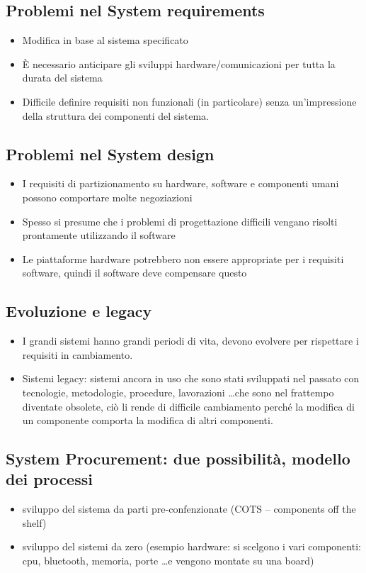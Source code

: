 \subsection{Problemi nel System requirements}
\begin{itemize}
     \item Modifica in base al sistema specificato
     \item È necessario anticipare gli sviluppi hardware/comunicazioni per tutta la durata del sistema
     \item Difficile definire requisiti non funzionali (in particolare) senza un'impressione della struttura dei componenti del sistema.
\end{itemize}
\subsection{Problemi nel System design}
\begin{itemize}
     \item I requisiti di partizionamento su hardware, software e componenti umani possono comportare molte negoziazioni
     \item Spesso si presume che i problemi di progettazione difficili vengano risolti prontamente utilizzando il software
     \item Le piattaforme hardware potrebbero non essere appropriate per i requisiti software, quindi il software deve compensare questo
\end{itemize}
\subsection{Evoluzione e legacy}
\begin{itemize}
    \item I grandi sistemi hanno grandi periodi di vita, devono evolvere per rispettare i requisiti in cambiamento.
    \item Sistemi legacy: sistemi ancora in uso che sono stati sviluppati nel passato con tecnologie, metodologie, procedure, lavorazioni \dots che sono nel frattempo diventate obsolete, ciò li rende di difficile cambiamento perché la modifica di un componente comporta la modifica di altri componenti.
\end{itemize}
\subsection{System Procurement: due possibilità, modello dei processi}
\begin{itemize}
    \item sviluppo del sistema da parti pre-confenzionate (COTS -- components off the shelf)
    \item sviluppo del sistemi da zero (esempio hardware: si scelgono i vari componenti: cpu, bluetooth, memoria, porte \dots e vengono montate su una board)
\end{itemize}
